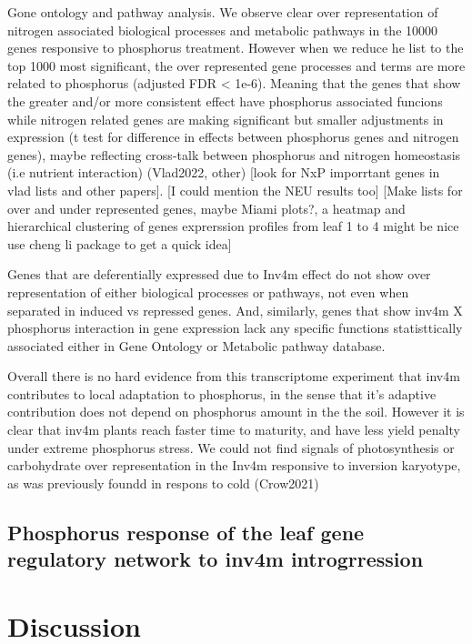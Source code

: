 Gone ontology and pathway analysis. 
We observe clear over representation of nitrogen associated biological processes and metabolic pathways in  the 10000 genes responsive to phosphorus treatment.
However when we reduce he list to the top 1000 most significant, the over represented gene processes and terms are more related to phosphorus (adjusted FDR < 1e-6). 
Meaning that the genes that show the greater and/or more consistent effect  have phosphorus associated funcions while nitrogen related genes are making significant but smaller adjustments in expression (t test for difference in effects between phosphorus genes and nitrogen genes), maybe reflecting cross-talk between phosphorus and nitrogen homeostasis (i.e nutrient interaction) (Vlad2022, other) [look for NxP imporrtant genes in vlad lists and other papers]. [I could mention the NEU results too]
[Make lists for over and under represented genes, maybe Miami plots?, a heatmap and hierarchical clustering of genes exprerssion profiles from leaf 1 to 4 might be nice use cheng li package to get a quick idea]

Genes that are deferentially expressed  due to Inv4m effect do not show over representation of either biological processes or pathways, not even when separated in induced vs repressed genes.
And, similarly, genes that show inv4m X phosphorus interaction in gene expression lack any specific functions statisttically associated either in Gene Ontology or Metabolic pathway database.

Overall there is no hard evidence from this transcriptome experiment that inv4m contributes to local adaptation to phosphorus, in the sense that it's adaptive contribution does not depend on phosphorus amount in the the soil.
However it is clear that inv4m plants reach faster time to maturity, and have less yield penalty under extreme phosphorus stress.
We could not find signals of photosynthesis or carbohydrate over representation in the Inv4m responsive to inversion karyotype, as was previously foundd in respons to cold (Crow2021) 


\subsection{Phosphorus response of the leaf gene regulatory network to inv4m introgrression}
\section{Discussion}


\printbibliography[heading=subbibintoc, title=References,]